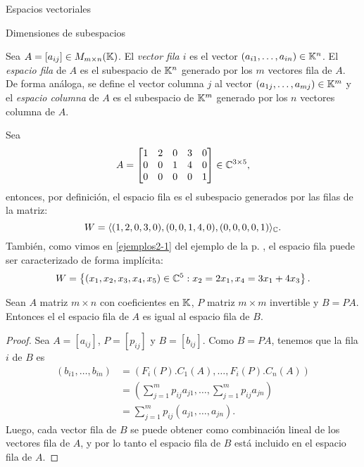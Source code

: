 \begin{chapter}{Espacios vectoriales}
\begin{section}{Dimensiones de subespacios}
        
    \begin{definicion}\label{espacio-fila-columna}
        Sea $A = [a_{ij}] \in M_{m \times n}(\mathbb K)$. El \textit{vector fila $i$} es el vector  $(a_{i1},\ldots,a_{in}) \in \mathbb K^n$. El \textit{espacio fila} de $A$ es el subespacio de $\mathbb K^n$ generado por los $m$ vectores fila de $A$.  De forma análoga, se define  el vector columna $j$ al vector $(a_{1j},\ldots,a_{mj}) \in \mathbb K^m$ y  el \textit{espacio columna} de $A$ es el subespacio de $\mathbb K^m$ generado por los $n$ vectores columna de $A$.  
    \end{definicion}

    \begin{ejemplo*}
        Sea
        $$
        A = \begin{bmatrix}
        1&2&0&3&0\\ 0&0&1&4&0 \\0&0&0&0&1
        \end{bmatrix} \in \mathbb C^{3 \times 5},
        $$
        entonces, por definición, el espacio fila es el subespacio generados por las filas de la matriz: 
        $$
        W = \langle  (1,2,0,3,0), (0,0,1,4,0), (0,0,0,0,1) \rangle_\mathbb C.
        $$ 
        También, como vimos en \ref{ejemplos2-1} del ejemplo de la p. \pageref{ejemplos2}, el espacio fila puede ser caracterizado de forma implícita:
        \begin{align*}
        W =\left\{(x_1,x_2,x_3,x_4,x_5)\in \mathbb C^5: x_2 = 2x_1, x_4 = 3x_1+4x_3 \right\}.
        \end{align*}
    \end{ejemplo*}
	

        \begin{teorema}
            Sean $A$ matriz $m \times n$ con coeficientes en $\mathbb K$, $P$ matriz $m\times m$ invertible y $B =PA$. Entonces el el espacio fila de $A$ es igual al espacio fila de $B$.
        \end{teorema}
        \begin{proof}
            Sea $A= [a_{ij}]$, $P =[p_{ij}]$ y $B = [b_{ij}]$. Como  $B= PA$, tenemos que la fila $i$ de $B$ es
            \begin{align*}
                (b_{i1},\ldots,b_{in})&= (F_i(P).C_1(A),\ldots,F_i(P).C_n(A)) \\
                &= (\sum_{j=1}^{m} p_{ij}a_{j1}, \ldots, \sum_{j=1}^{m} p_{ij}a_{jn}) \\
                &= \sum_{j=1}^{m} p_{ij}(a_{j1}, \ldots,a_{jn}).
            \end{align*}
        Luego, cada vector fila de $B$ se puede obtener como combinación lineal de los vectores fila de $A$, y por lo tanto el espacio fila de $B$ está incluido en el espacio fila de $A$. 
        

\end{proof}
\end{section}
\end{chapter}
